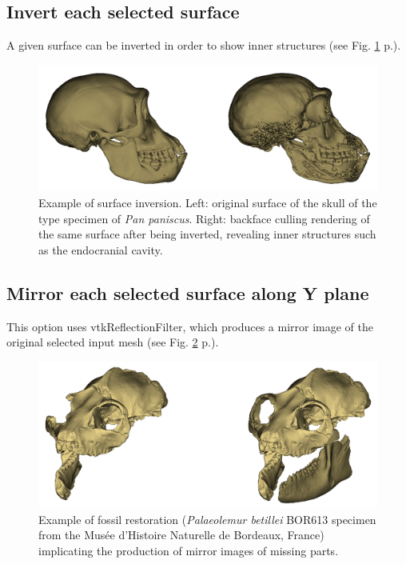 \subsection{Invert each selected surface}

A given surface can be inverted in order to show inner structures (see Fig. \ref{inversion} p.\pageref{inversion}).\\


\begin{figure}
  \centering
  \includegraphics[scale=0.32]{images/09/structure/inversion_example.png} 
	\caption{Example of surface inversion. Left: original surface of the skull of the type specimen of \textit{Pan paniscus}.
Right: backface culling rendering of the same surface after being inverted, revealing inner structures such as the endocranial cavity. }
\label{inversion}
 
\end{figure}

\subsection{Mirror each selected surface along Y plane}

This option uses vtkReflectionFilter, which produces a mirror image of the original selected input mesh (see Fig. \ref{mirror} p.\pageref{mirror}).\\

\begin{figure}
  \centering
  \includegraphics[scale=0.32]{images/09/structure/image_mirror.png} 
	\caption{Example of fossil restoration (\textit{Palaeolemur betillei} BOR613 specimen from the Musée d'Histoire Naturelle de Bordeaux, France) implicating the production of mirror images of missing parts.}
 \label{mirror}
\end{figure}

